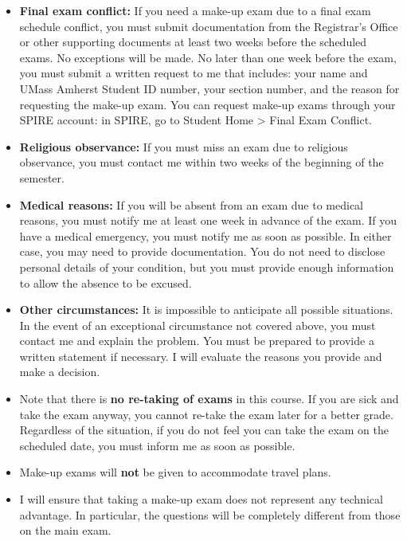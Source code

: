 \documentclass[11pt]{article}
\begin{document}
\begin{itemize}
\item \textbf{Final exam conflict:} If you need a make-up exam due to a final exam
schedule conflict, you must submit documentation from the Registrar's Office
or other supporting documents at least two weeks before the scheduled exams.
No exceptions will be made. No later than one week before the exam, you must
submit a written request to me that includes: your name and UMass Amherst
Student ID number, your section number, and the reason for requesting the
make-up exam. You can request make-up exams through your SPIRE account: in
SPIRE, go to Student Home > Final Exam Conflict.

\item \textbf{Religious observance:} If you must miss an exam due to religious observance,
you must contact me within two weeks of the beginning of the semester.

\item \textbf{Medical reasons:} If you will be absent from an exam due to medical reasons,
you must notify me at least one week in advance of the exam. If you have a
medical emergency, you must notify me as soon as possible. In either case,
you may need to provide documentation. You do not need to disclose personal
details of your condition, but you must provide enough information to allow
the absence to be excused.

\item \textbf{Other circumstances:} It is impossible to anticipate all possible
situations. In the event of an exceptional circumstance not covered above,
you must contact me and explain the problem. You must be prepared to provide
a written statement if necessary. I will evaluate the reasons you provide and
make a decision.

\item Note that there is \textbf{no re-taking of exams} in this course. If you are sick
and take the exam anyway, you cannot re-take the exam later for a better
grade. Regardless of the situation, if you do not feel you can take the exam
on the scheduled date, you must inform me as soon as possible.

\item Make-up exams will \textbf{not} be given to accommodate travel plans.

\item I will ensure that taking a make-up exam does not represent any technical
advantage. In particular, the questions will be completely different from
those on the main exam.
\end{itemize}
\end{document}
